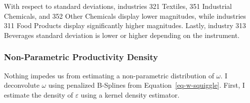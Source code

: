 \documentclass[
  12pt]{article}
\theoremstyle{definition}
\theoremstyle{remark}
\begin{document}
With respect to standard deviations, industries 321 Textiles, 351
Industrial Chemicals, and 352 Other Chemicals display lower magnitudes,
while industries 311 Food Products display significantly higher
magnitudes. Lastly, industry 313 Beverages standard deviation is lower
or higher depending on the instrument.

\subsubsection{Non-Parametric Productivity
Density}\label{non-parametric-productivity-density}

Nothing impedes us from estimating a non-parametric distribution of
\(\omega\). I deconvolute \(\omega\) using penalized B-Splines from
Equation~\ref{eq-w-squiggle}. First, I estimate the density of
\(\varepsilon\) using a kernel density estimator.

\begin{table}

\caption{\label{tbl-np-prod}Non-Parametric Deconvolution of \(\omega\)
using Penalized B-Splines. The error density function is estimated using
a kernel density estimator fitted on the residuals of the first stage
conditional on firms being Non-Evaders.}


\end{table}%
\end{document}
